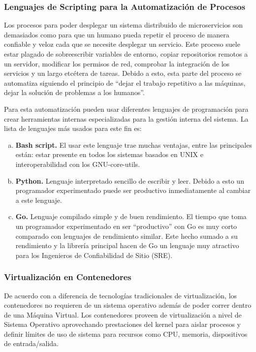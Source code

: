 \subsubsection{Lenguajes de Scripting para la Automatización de Procesos}

Los procesos para poder desplegar un sistema distribuido de microservicios son demasiados como para que 
un humano pueda repetir el proceso de manera confiable y veloz cada que se necesite desplegar un servicio.
Este proceso suele estar plagado de sobreescribir variables de entorno, copiar repositorios remotos
a un servidor, modificar los permisos de red, comprobar la integración de los servicios y un largo etcétera
de tareas.
Debido a esto, esta parte del proceso se automatiza siguiendo el principio de ``dejar el trabajo repetitivo
a las máquinas, dejar la solución de problemas a los humanos''.

Para esta automatización pueden usar diferentes lenguajes de programación para crear herramientas internas
especializadas para la gestión interna del sistema.
La lista de lenguajes más usados para este fin es:

\vspace{-1em}
\begin{enumerate}[a.]
  \item \textbf{Bash script.}
    El usar este lenguaje trae muchas ventajas, entre las principales están: estar presente en todos
    los sistemas basados en UNIX e interoperabilidad con los GNU-core-utils.
  \item \textbf{Python.}
    Lenguaje interpretado sencillo de escribir y leer.
    Debido a esto un programador experimentado puede ser productivo inmediatamente al cambiar a este lenguaje.
  \item \textbf{Go.}
    Lenguaje compilado simple y de buen rendimiento.
    El tiempo que toma un programador experimentado en ser ``productivo'' con Go es muy corto comparado con
    lenguajes de rendimiento similar.
    Este hecho sumado a su rendimiento y la librería principal hacen de Go un lenguaje muy atractivo
    para los Ingenieros de Confiabilidad de Sitio (SRE).
\end{enumerate}
\vspace{-1em}


\subsubsection{Virtualización en Contenedores}
De acuerdo con \cite{celesti2016exploring} a diferencia de tecnologías tradicionales de virtualización,
los contenedores no requieren de un sistema operativo además de poder correr dentro de una Máquina Virtual.
Los contenedores proveen de virtualización a nivel de Sistema Operativo aprovechando prestaciones del kernel
para aislar procesos y definir límites de uso de sistema para recursos como CPU, memoria, dispositivos de
entrada/salida.


